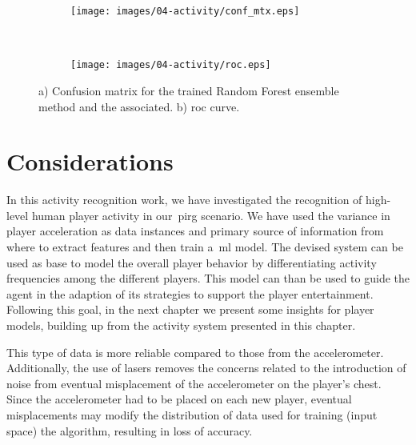 \begin{figure}[h]
    \centering
    \begin{subfigure}[h]{7cm}
       \centering
       \texttt{[image: images/04-activity/conf\_mtx.eps]}
       \caption{}
	\end{subfigure}
	~
    \begin{subfigure}[h]{7cm}
     	\centering
        \texttt{[image: images/04-activity/roc.eps]}
        \caption{}
	\end{subfigure}
	\caption{a) Confusion matrix for the trained Random Forest ensemble method and the associated. b) \gls{roc} curve.}\label{fig:mtx-roc}
\end{figure}

\section{Considerations}

In this activity recognition work, we have investigated the recognition of high-level human player activity in our~\gls{pirg} scenario. We have used the variance in player acceleration as data instances and primary source of information from where to extract features and then train a~\gls{ml} model. The devised system can be used as base to model the overall player behavior by differentiating activity frequencies among the different players. This model can than be used to guide the agent in the adaption of its strategies to support the player entertainment. Following this goal, in the next chapter we present some insights for player models, building up from the activity system presented in this chapter.

This type of data is more reliable compared to those from the accelerometer. Additionally, the use of lasers removes the concerns related to the introduction of noise from eventual misplacement of the accelerometer on the player's chest. Since the accelerometer had to be placed on each new player, eventual misplacements may modify the distribution of data used for training (input space) the algorithm, resulting in loss of accuracy. 
